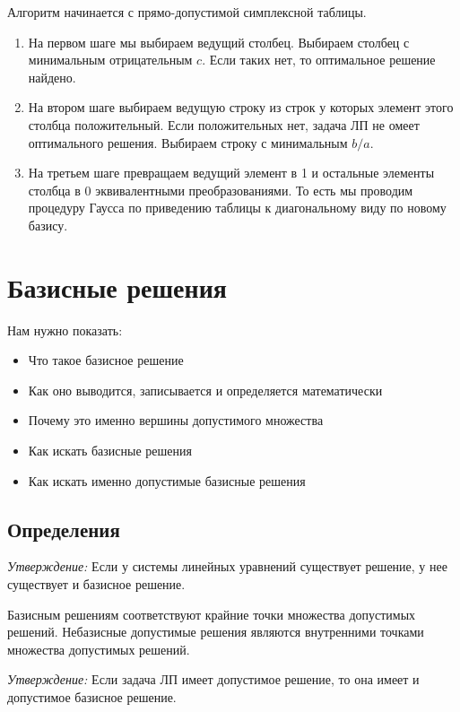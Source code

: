\documentclass[a4paper,article,14pt]{extarticle}
\begin{document}
Алгоритм начинается с прямо-допустимой симплексной таблицы.

\begin{enumerate}
    \item
        На первом шаге мы выбираем ведущий столбец.
        Выбираем столбец с минимальным отрицательным \(c\).
        Если таких нет, то оптимальное решение найдено.
    \item
        На втором шаге выбираем ведущую строку из строк у которых элемент этого столбца положительный.
        Если положительных нет, задача ЛП не омеет оптимального решения.
        Выбираем строку с минимальным \(b/a\).
    \item
        На третьем шаге превращаем ведущий элемент в 1 и остальные элементы столбца в 0 эквивалентными преобразованиями.
        То есть мы проводим процедуру Гаусса по приведению таблицы к диагональному виду по новому базису.
\end{enumerate}

\section{Базисные решения}

Нам нужно показать:
\begin{itemize}
    \item Что такое базисное решение
    \item Как оно выводится, записывается и определяется математически
    \item Почему это именно вершины допустимого множества
    \item Как искать базисные решения
    \item Как искать именно допустимые базисные решения
\end{itemize}

\subsection{Определения}

\textit{Утверждение:} Если у системы линейных уравнений существует решение, у нее существует и базисное решение.

Базисным решениям соответствуют крайние точки множества допустимых решений.
Небазисные допустимые решения являются внутренними точками множества допустимых решений.

\textit{Утверждение:} Если задача ЛП имеет допустимое решение, то она имеет и допустимое базисное решение.
\end{document}
